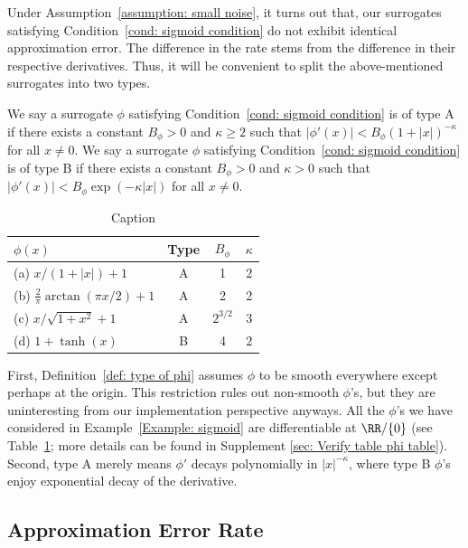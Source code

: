 \documentclass[preprint] {imsart}
\begin{document}
Under Assumption~\ref{assumption: small noise}, it turns out that, our surrogates satisfying Condition~\ref{cond: sigmoid  condition} do not exhibit identical approximation error. The difference in the rate stems from the difference in their respective derivatives. Thus, it will be convenient to split the above-mentioned surrogates into two types.
\begin{definition}
\label{def: type of phi}
We say a surrogate $\phi$ satisfying Condition~\ref{cond: sigmoid  condition} is of type A if there exists a constant $B_\phi>0$ and $\kappa\geq 2$ such that $|\phi'(x)|<B_\phi(1+|x|)^{-\kappa}$ for all $x\neq 0$.
We say a surrogate $\phi$ satisfying Condition~\ref{cond: sigmoid  condition} is of type B if there exists a constant $B_\phi>0$ and $\kappa>0$ such that $|\phi'(x)|<B_\phi \exp(-\kappa|x|)$ for all $x\neq 0$.
\end{definition}

\begin{table}[]
    \centering
    \begin{tabular}{lccc}
      $\phi(x)$  &   Type & $B_\phi$ & $\kappa$\\
       \hline\hline
     (a)  $x/(1+|x|)+1 $ & A & 1 & 2\\
      (b) $\frac{2}{\pi}\arctan(\pi x/2)+1$ & A & 2 & 2\\
     (c)  $x/\sqrt{1+x^2}+1$ & A & $2^{3/2}$ & $3$\\
      (d) $1+\tanh(x)$ & B & 4 & $2$\\
       \hline
    \end{tabular}
    \caption{Caption}
    \label{tab: phi table}
\end{table}


First, Definition~\ref{def: type of phi} assumes $\phi$ to be smooth everywhere except perhaps at the origin. This restriction rules out non-smooth $\phi$'s, but they are uninteresting from our implementation perspective anyways. All the $\phi$'s we have considered in Example~\ref{Example: sigmoid} are differentiable at $\RR/\{0\}$ (see  Table~\ref{tab: phi table}; more details can be found in  Supplement \ref{sec: Verify table phi table}). Second, type A merely means  $\phi'$ decays polynomially in $|x|^{-\kappa}$, where type B $\phi$'s enjoy exponential decay of the derivative. 

\subsection{Approximation Error Rate}
\label{sec: approx-rate}
\end{document}
